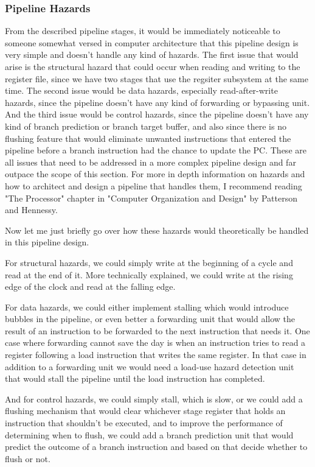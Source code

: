 \subsubsection{Pipeline Hazards}
From the described pipeline stages, it would be immediately noticeable to someone somewhat versed in computer architecture that this pipeline design is very simple and doesn't handle any kind of hazards. The first issue that would arise is the structural hazard that could occur when reading and writing to the register file, since we have two stages that use the regsiter subsystem at the same time. The second issue would be data hazards, especially read-after-write hazards, since the pipeline doesn't have any kind of forwarding or bypassing unit. And the third issue would be control hazards, since the pipeline doesn't have any kind of branch prediction or branch target buffer, and also since there is no flushing feature that would eliminate unwanted instructions that entered the pipeline before a branch instruction had the chance to update the PC. These are all issues that need to be addressed in a more complex pipeline design and far outpace the scope of this section. For more in depth information on hazards and how to architect and design a pipeline that handles them, I recommend reading "The Processor" chapter in "Computer Organization and Design" by Patterson and Hennessy\cite{patterson1994computer}.

Now let me just briefly go over how these hazards would theoretically be handled in this pipeline design.

For structural hazards, we could simply write at the beginning of a cycle and read at the end of it. More technically explained, we could write at the rising edge of the clock and read at the falling edge.

For data hazards, we could either implement stalling which would introduce bubbles in the pipeline, or even better a forwarding unit that would allow the result of an instruction to be forwarded to the next instruction that needs it. One case where forwarding cannot save the day is when an instruction tries to read a register following a load instruction that writes the same register\cite{patterson1994computer}. In that case in addition to a forwarding unit we would need a load-use hazard detection unit that would stall the pipeline until the load instruction has completed.

And for control hazards, we could simply stall, which is slow, or we could add a flushing mechanism that would clear whichever stage register that holds an instruction that shouldn't be executed, and to improve the performance of determining when to flush, we could add a branch prediction unit that would predict the outcome of a branch instruction and based on that decide whether to flush or not.

